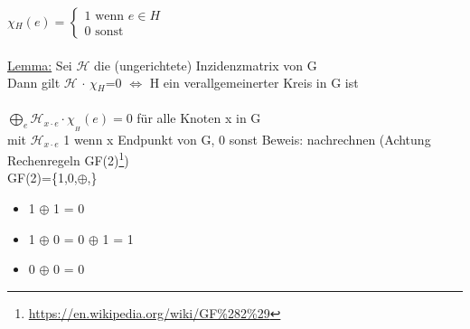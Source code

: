 {\LARGE $\chi$}$_H(e)=
	\begin{cases}
		\text{1 wenn } e \in H\\
		\text{0 sonst}
	\end{cases}
$
\\\\
\underline{Lemma:} Sei $\mathcal{H}$ die (ungerichtete) Inzidenzmatrix von G\\
Dann gilt {\large$\mathcal{H}$} $\cdot$ {\Large $\chi$}$_H$=0 $\Leftrightarrow$ H ein verallgemeinerter Kreis in G ist
\\\\
$\bigoplus\limits_{e} \mathcal{H}_{x \cdot e} \cdot \chi_{_H}(e)=0$ für alle Knoten x in G\\
mit $\mathcal{H}_{x \cdot e}$ 1 wenn x Endpunkt von G, 0 sonst
\newpage
Beweis: nachrechnen (Achtung Rechenregeln GF(2)\footnote{\url{https://en.wikipedia.org/wiki/GF\%282\%29}})\\
GF(2)=\{1,0,$\oplus$,\}
\begin{itemize}
	\item 1 $\oplus$ 1 = 0
	\item 1 $\oplus$ 0 = 0 $\oplus$ 1 = 1
	\item 0 $\oplus$ 0 = 0
\end{itemize}

